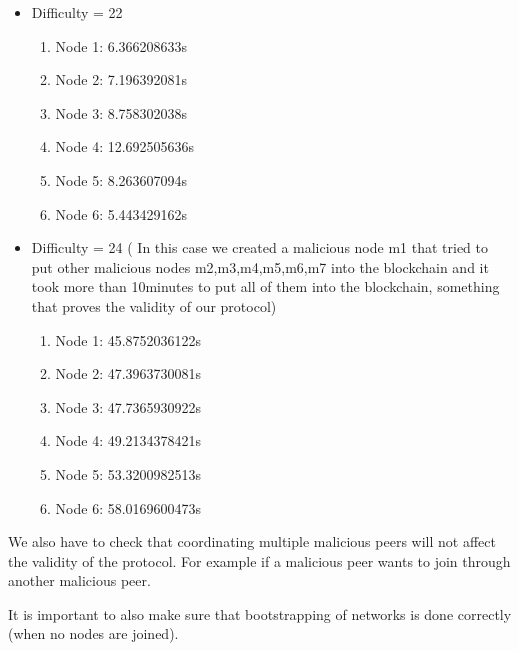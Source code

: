 \documentclass[twocolumn]{article}
\begin{document}
\begin{itemize}
\begin{enumerate}
        \end{enumerate}
    \item Difficulty = 22
        \begin{enumerate}
        \item Node 1: 6.366208633s
        \item Node 2: 7.196392081s	
        \item Node 3: 8.758302038s
        \item Node 4: 12.692505636s
        \item Node 5: 8.263607094s
        \item Node 6: 5.443429162s
        \end{enumerate}
    \item Difficulty = 24 ( In this case we created a malicious node m1 that tried to put other malicious nodes m2,m3,m4,m5,m6,m7 into the blockchain and it took more than 10minutes to put all of them into the blockchain, something that proves the validity of our protocol)
        \begin{enumerate}
        \item Node 1: 45.8752036122s 
        \item Node 2: 47.3963730081s
        \item Node 3: 47.7365930922s
        \item Node 4: 49.2134378421s
        \item Node 5: 53.3200982513s
        \item Node 6: 58.0169600473s
        \end{enumerate}       
       
        
\end{itemize}



We also have to check that coordinating multiple malicious peers will not affect the validity of the protocol. For example if a malicious peer wants to join through another malicious peer.

It is important to also make sure that bootstrapping of networks is done correctly (when no nodes are joined).
\printbibliography
\end{document}

